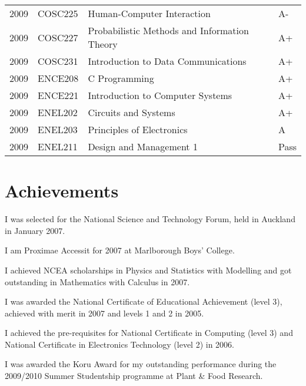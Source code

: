 \documentclass[10pt]{article}
\newenvironment{packed_items}{
    \begin{itemize}
    \setlength{\itemsep}{1pt}
    \setlength{\parskip}{0pt}
    \setlength{\parsep}{0pt}
}{\end{itemize}}
\begin{document}
{\begin{tabularx}{\textwidth}{llXl}
                2009 & COSC225 & Human-Computer Interaction                         & A-   \\
                2009 & COSC227 & Probabilistic Methods and Information Theory       & A+   \\
                2009 & COSC231 & Introduction to Data Communications                & A+   \\
                2009 & ENCE208 & C Programming                                      & A+   \\
                2009 & ENCE221 & Introduction to Computer Systems                   & A+   \\
                2009 & ENEL202 & Circuits and Systems                               & A+   \\
                2009 & ENEL203 & Principles of Electronics                          & A    \\
                2009 & ENEL211 & Design and Management 1                            & Pass \\
                \hline
            \end{tabularx}
            }

   \section*{Achievements}
        \begin{packed_items}
            \item{I was selected for the National Science and Technology Forum, held in Auckland in January 2007.}
            \item{I am Proximae Accessit for 2007 at Marlborough Boys’ College.}
            \item{I achieved NCEA scholarships in Physics and Statistics with Modelling and got outstanding in Mathematics with Calculus in 2007.}
            \item{I was awarded the National Certificate of Educational Achievement (level 3), achieved with merit in 2007 and levels 1 and 2 in 2005.}
            \item{I achieved the pre-requisites for National Certificate in Computing (level 3) and National Certificate in Electronics Technology (level 2) in 2006.}
            \item{I was awarded the Koru Award for my outstanding performance during the 2009/2010 Summer Studentship programme at Plant \& Food Research.}
        \end{packed_items}
\end{document}

